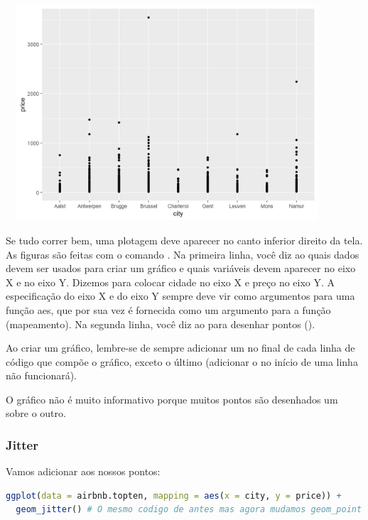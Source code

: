 \documentclass{article}
\begin{document}
\begin{center}
\includegraphics[width=12cm,height=8cm]{intro_scatterplot-1.png}
\end{center}

Se tudo correr bem, uma plotagem deve aparecer no canto inferior direito da tela. As figuras são feitas com o comando . Na primeira linha, você diz ao  quais dados devem ser usados para criar um gráfico e quais variáveis devem aparecer no eixo X e no eixo Y. Dizemos para colocar cidade no eixo X e preço no eixo Y. A especificação do eixo X e do eixo Y sempre deve vir como argumentos para uma função aes, que por sua vez é fornecida como um argumento para a função  (mapeamento). Na segunda linha, você diz ao  para desenhar pontos ().

Ao criar um gráfico, lembre-se de sempre adicionar um \fbox{$+$} no final de cada linha de código que compõe o gráfico, exceto o último (adicionar o \fbox{$+$} no início de uma linha não funcionará).

O gráfico não é muito informativo porque muitos pontos são desenhados um sobre o outro.

\subsubsection{Jitter}

Vamos adicionar  aos nossos pontos:

\begin{lstlisting}[language=R]
ggplot(data = airbnb.topten, mapping = aes(x = city, y = price)) + 
  geom_jitter() # O mesmo codigo de antes mas agora mudamos geom_point para geom_jitter.
\end{lstlisting}
\end{document}
